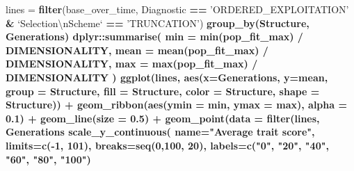 \documentclass[]{book}
\newenvironment{Shaded}{\begin{snugshade}}{\end{snugshade}}
\newcommand{\CharTok}[1]{\textcolor[rgb]{0.31,0.60,0.02}{#1}}
\newcommand{\DataTypeTok}[1]{\textcolor[rgb]{0.13,0.29,0.53}{#1}}
\newcommand{\DecValTok}[1]{\textcolor[rgb]{0.00,0.00,0.81}{#1}}
\newcommand{\FloatTok}[1]{\textcolor[rgb]{0.00,0.00,0.81}{#1}}
\newcommand{\KeywordTok}[1]{\textcolor[rgb]{0.13,0.29,0.53}{\textbf{#1}}}
\newcommand{\NormalTok}[1]{#1}
\newcommand{\OperatorTok}[1]{\textcolor[rgb]{0.81,0.36,0.00}{\textbf{#1}}}
\newcommand{\StringTok}[1]{\textcolor[rgb]{0.31,0.60,0.02}{#1}}
\begin{document}
\begin{Shaded}
\begin{Highlighting}[]
\NormalTok{lines =}\StringTok{ }\KeywordTok{filter}\NormalTok{(base_over_time, Diagnostic }\OperatorTok{==}\StringTok{ 'ORDERED_EXPLOITATION'} \OperatorTok{&}\StringTok{ `}\DataTypeTok{Selection}\CharTok{\textbackslash{}n}\DataTypeTok{Scheme}\StringTok{`} \OperatorTok{==}\StringTok{ 'TRUNCATION'}\NormalTok{) }\OperatorTok{%>%}
\StringTok{  }\KeywordTok{group_by}\NormalTok{(Structure, Generations) }\OperatorTok{%>%}
\StringTok{  }\NormalTok{dplyr}\OperatorTok{::}\KeywordTok{summarise}\NormalTok{(}
    \DataTypeTok{min =} \KeywordTok{min}\NormalTok{(pop_fit_max) }\OperatorTok{/}\StringTok{ }\NormalTok{DIMENSIONALITY,}
    \DataTypeTok{mean =} \KeywordTok{mean}\NormalTok{(pop_fit_max) }\OperatorTok{/}\StringTok{ }\NormalTok{DIMENSIONALITY,}
    \DataTypeTok{max =} \KeywordTok{max}\NormalTok{(pop_fit_max) }\OperatorTok{/}\StringTok{ }\NormalTok{DIMENSIONALITY}
\NormalTok{  )}
\KeywordTok{ggplot}\NormalTok{(lines, }\KeywordTok{aes}\NormalTok{(}\DataTypeTok{x=}\NormalTok{Generations, }\DataTypeTok{y=}\NormalTok{mean, }\DataTypeTok{group =}\NormalTok{ Structure, }\DataTypeTok{fill =}\NormalTok{ Structure, }\DataTypeTok{color =}\NormalTok{ Structure, }\DataTypeTok{shape =}\NormalTok{ Structure)) }\OperatorTok{+}
\StringTok{  }\KeywordTok{geom_ribbon}\NormalTok{(}\KeywordTok{aes}\NormalTok{(}\DataTypeTok{ymin =}\NormalTok{ min, }\DataTypeTok{ymax =}\NormalTok{ max), }\DataTypeTok{alpha =} \FloatTok{0.1}\NormalTok{) }\OperatorTok{+}
\StringTok{  }\KeywordTok{geom_line}\NormalTok{(}\DataTypeTok{size =} \FloatTok{0.5}\NormalTok{) }\OperatorTok{+}
\StringTok{  }\KeywordTok{geom_point}\NormalTok{(}\DataTypeTok{data =} \KeywordTok{filter}\NormalTok{(lines, Generations }\OperatorTok{%%}\StringTok{ }\DecValTok{2000} \OperatorTok{==}\StringTok{ }\DecValTok{0}\NormalTok{), }\DataTypeTok{size =} \FloatTok{2.5}\NormalTok{, }\DataTypeTok{stroke =} \FloatTok{2.0}\NormalTok{, }\DataTypeTok{alpha =} \FloatTok{1.0}\NormalTok{) }\OperatorTok{+}
\StringTok{  }\KeywordTok{scale_y_continuous}\NormalTok{(}
    \DataTypeTok{name=}\StringTok{"Average trait score"}\NormalTok{,}
    \DataTypeTok{limits=}\KeywordTok{c}\NormalTok{(}\OperatorTok{-}\DecValTok{1}\NormalTok{, }\DecValTok{101}\NormalTok{),}
    \DataTypeTok{breaks=}\KeywordTok{seq}\NormalTok{(}\DecValTok{0}\NormalTok{,}\DecValTok{100}\NormalTok{, }\DecValTok{20}\NormalTok{),}
    \DataTypeTok{labels=}\KeywordTok{c}\NormalTok{(}\StringTok{"0"}\NormalTok{, }\StringTok{"20"}\NormalTok{, }\StringTok{"40"}\NormalTok{, }\StringTok{"60"}\NormalTok{, }\StringTok{"80"}\NormalTok{, }\StringTok{"100"}\NormalTok{)}
}}}
\end{Highlighting}
\end{Shaded}
\end{document}
